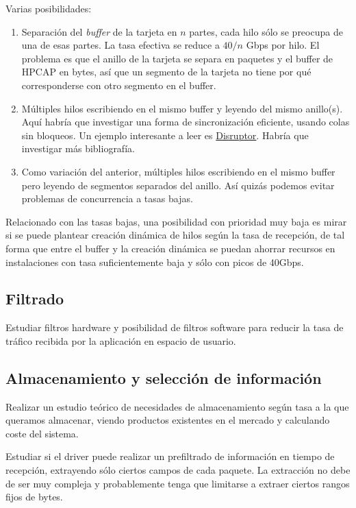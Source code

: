 \documentclass[twoside, draft]{epstfg}
\begin{document}
Varias posibilidades:

\begin{enumerate}
\item Separación del \textit{buffer} de la tarjeta en $n$ partes, cada hilo sólo se preocupa de una de esas partes. La tasa efectiva se reduce a $40 / n$ Gbps por hilo. El problema es que el anillo de la tarjeta se separa en paquetes y el buffer de HPCAP en bytes, así que un segmento de la tarjeta no tiene por qué corresponderse con otro segmento en el buffer.
\item Múltiples hilos escribiendo en el mismo buffer y leyendo del mismo anillo(s). Aquí habría que investigar una forma de sincronización eficiente, usando colas sin bloqueos. Un ejemplo interesante a leer es \href{http://disruptor.googlecode.com/files/Disruptor-1.0.pdf}{Disruptor}. Habría que investigar más bibliografía.
\item Como variación del anterior, múltiples hilos escribiendo en el mismo buffer pero leyendo de segmentos separados del anillo. Así quizás podemos evitar problemas de concurrencia a tasas bajas.
\end{enumerate}

Relacionado con las tasas bajas, una posibilidad con prioridad muy baja es mirar si se puede plantear creación dinámica de hilos según la tasa de recepción, de tal forma que entre el buffer y la creación dinámica se puedan ahorrar recursos en instalaciones con tasa suficientemente baja y sólo con picos de 40Gbps.

\subsection{Filtrado}

Estudiar filtros hardware y posibilidad de filtros software para reducir la tasa de tráfico recibida por la aplicación en espacio de usuario.

\subsection{Almacenamiento y selección de información}

Realizar un estudio teórico de necesidades de almacenamiento según tasa a la que queramos almacenar, viendo productos existentes en el mercado y calculando coste del sistema.

Estudiar si el driver puede realizar un prefiltrado de información en tiempo de recepción, extrayendo sólo ciertos campos de cada paquete. La extracción no debe de ser muy compleja y probablemente tenga que limitarse a extraer ciertos rangos fijos de bytes.
\end{document}
